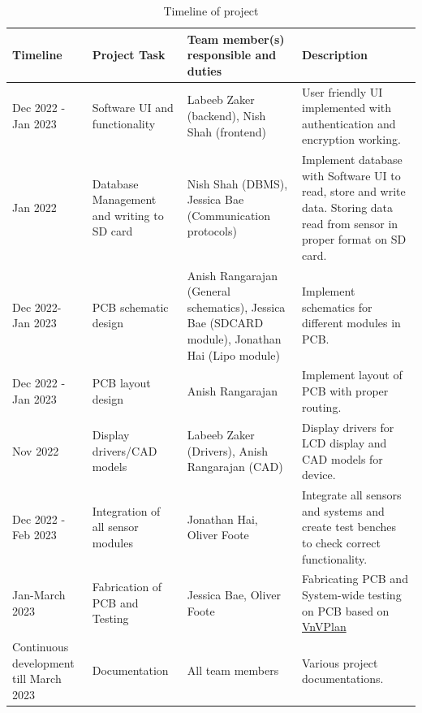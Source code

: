 \documentclass[12pt, titlepage]{article}
\begin{document}
\begin{table}[H]
	\begin{tabularx}{1.05\textwidth} { 
		  | >{\centering\arraybackslash}X 
		  | >{\centering\arraybackslash}X 
		  | >{\centering\arraybackslash}X 
		  | >{\centering\arraybackslash}X | }
		 \hline
		 \textbf{Timeline} & \textbf{Project Task} & \textbf{Team member(s) responsible and duties} & \textbf{Description}\\
		 \hline
		Dec 2022 - Jan 2023 & Software UI and functionality & Labeeb Zaker (backend), Nish Shah (frontend) & User friendly UI implemented with authentication and encryption working. \\
		\hline
		Jan 2022 & Database Management and writing to SD card & Nish Shah (DBMS), Jessica Bae (Communication protocols) & Implement database with Software UI to read, store and write data. Storing data read from sensor in proper format on SD card.\\
		\hline
		Dec 2022- Jan 2023 & PCB schematic design & Anish Rangarajan (General schematics), Jessica Bae (SDCARD module), Jonathan Hai (Lipo module) & Implement schematics for different modules in PCB. \\
		\hline
		Dec 2022 - Jan 2023 & PCB layout design & Anish Rangarajan  & Implement layout of PCB with proper routing.\\
		\hline
		Nov 2022 & Display drivers/CAD models & Labeeb Zaker (Drivers), Anish Rangarajan (CAD) & Display drivers for LCD display and CAD models for device.\\
		\hline
		Dec 2022 -Feb 2023 & Integration of all sensor modules & Jonathan Hai, Oliver Foote & Integrate all sensors and systems and create test benches to check correct 			functionality.\\
		\hline
			Jan-March 2023 & Fabrication of PCB and Testing  & Jessica Bae, Oliver Foote & Fabricating PCB and System-wide testing on PCB based on \href{https://github.com/zakerl/Capstone_Project/blob/main/docs/VnVPlan/VnVPlan.pdf}{VnVPlan} \\
		\hline
		Continuous development till March 2023 & Documentation & All team members & Various project documentations. \\
		\hline
	\end{tabularx}
\caption{\label{Timeline}Timeline of project}  
\end{table}


% 

\newpage{}
\end{document}
